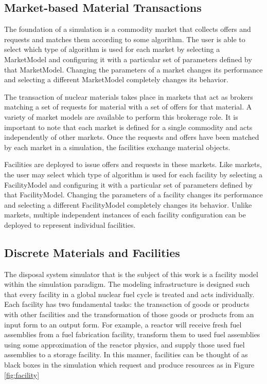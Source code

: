 \subsection{Market-based Material Transactions}

The foundation of a simulation is a commodity market that collects 
offers and requests and matches them according to some algorithm.  The 
user is able to select which type of algorithm is used for each market 
by selecting a MarketModel and configuring it with a particular set of 
parameters defined by that MarketModel.  Changing the parameters of a 
market changes its performance and selecting a different MarketModel 
completely changes its behavior.

The transaction of nuclear materials takes place in markets that act
as brokers matching a set of requests for material with a set of
offers for that material. A variety of market models are available
to perform this brokerage role. It is important to note that each
market is defined for a single commodity and acts independently of
other markets. Once the requests and offers have been matched by each
market in a simulation, the facilities exchange material objects.

Facilities are deployed to issue offers and requests in these markets.  
Like markets, the user may select which type of algorithm is used for 
each facility by selecting a FacilityModel and configuring it with a 
particular set of parameters defined by that FacilityModel.  Changing 
the parameters of a facility changes its performance and selecting a 
different FacilityModel completely changes its behavior.  Unlike 
markets, multiple independent instances of each facility configuration 
can be deployed to represent individual facilities.


\subsection{Discrete Materials and Facilities}

The disposal system simulator that is the subject of this work is a facility model 
within the \Cyclus simulation paradigm.  The \Cyclus modeling infrastructure is 
designed such that every facility in a global nuclear fuel cycle is treated and 
acts individually.  Each facility has two fundamental tasks: the transaction of 
goods or products with other facilities and the transformation of those goods 
or products from an input form to an output form.  For example, a reactor will 
receive fresh fuel assemblies from a fuel fabrication facility, transform them 
to used fuel assemblies using some approximation of the reactor physics, and 
supply those used fuel assemblies to a storage facility. In this manner, 
facilities can be thought of as black boxes in the simulation which request and 
produce resources as in Figure \ref{fig:facility} 

